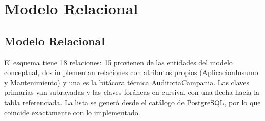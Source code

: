 \documentclass[11pt,letterpaper]{article}
\newcommand{\tbus}{\textunderscore\allowbreak}
\newcommand{\tb}[1]{{\ttfamily\let\_\tbus #1}}
\begin{document}
\section{Modelo Relacional}

\subsection{Modelo Relacional}

El esquema tiene 18 relaciones: 15 provienen de las entidades del modelo conceptual, dos implementan relaciones con atributos propios (\tb{Aplicacion\_Insumo} y \tb{Mantenimiento}) y una es la bitácora técnica \tb{Auditoria\_Campania}. Las claves primarias van subrayadas y las claves foráneas en cursiva, con una flecha hacia la tabla referenciada. La lista se generó desde el catálogo de PostgreSQL, por lo que coincide exactamente con lo implementado.
\end{document}
